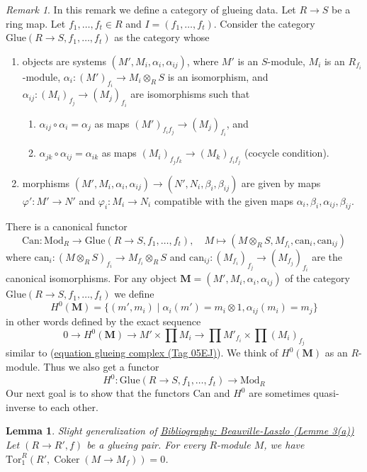 \documentclass{amsart}
\newenvironment{reference}{\comment}{\endcomment}
\theoremstyle{plain}
\newtheorem{lemma}[subsection]{Lemma}
\theoremstyle{definition}
\theoremstyle{remark}
\newtheorem{remark}[subsection]{Remark}
\numberwithin{equation}{subsection}
\def\Coker{\mathop{\mathrm{Coker}}}
\begin{document}
\begin{remark}
\label{remark-glueing-data}
In this remark we define a category of glueing data.
Let $R \to S$ be a ring map.
Let $f_1, \ldots, f_t \in R$ and $I = (f_1, \ldots, f_t)$.
Consider the category $\text{Glue}(R \to S, f_1, \ldots, f_t)$
as the category whose
\begin{enumerate}
\item objects are systems $(M', M_i, \alpha_i, \alpha_{ij})$, where
$M'$ is an $S$-module, $M_i$ is an $R_{f_i}$-module,
$\alpha_i : (M')_{f_i} \to M_i \otimes_R S$ is an isomorphism, and
$\alpha_{ij} : (M_i)_{f_j} \to (M_j)_{f_i}$ are isomorphisms
such that
\begin{enumerate}
\item $\alpha_{ij} \circ \alpha_i = \alpha_j$ as maps
$(M')_{f_if_j} \to (M_j)_{f_i}$, and
\item $\alpha_{jk} \circ \alpha_{ij} = \alpha_{ik}$ as maps
$(M_i)_{f_jf_k} \to (M_k)_{f_if_j}$ (cocycle condition).
\end{enumerate}
\item morphisms
$(M', M_i, \alpha_i, \alpha_{ij}) \to (N', N_i, \beta_i, \beta_{ij})$
are given by maps $\varphi' : M' \to N'$ and $\varphi_i : M_i \to N_i$
compatible with the given maps $\alpha_i, \beta_i, \alpha_{ij}, \beta_{ij}$.
\end{enumerate}
There is a canonical functor
$$
\text{Can} : \text{Mod}_R
\longrightarrow
\text{Glue}(R \to S, f_1, \ldots, f_t),
\quad
M \longmapsto (M \otimes_R S, M_{f_i}, \text{can}_i, \text{can}_{ij})
$$
where $\text{can}_i : (M \otimes_R S)_{f_i} \to M_{f_i} \otimes_R S$
and $\text{can}_{ij} : (M_{f_i})_{f_j} \to (M_{f_j})_{f_i}$
are the canonical isomorphisms. For any object
$\mathbf{M} = (M', M_i, \alpha_i, \alpha_{ij})$ of the category
$\text{Glue}(R \to S, f_1, \ldots, f_t)$ we define
$$
H^0(\mathbf{M}) =
\{(m', m_i) \mid \alpha_i(m') = m_i \otimes 1, \alpha_{ij}(m_i) = m_j\}
$$
in other words defined by the exact sequence
$$
0 \to H^0(\mathbf{M}) \to
M' \times \prod M_i \to
\prod M'_{f_i}
\times
\prod (M_i)_{f_j}
$$
similar to (\href{https://stacks.math.columbia.edu/tag/05EJ}{equation glueing complex (Tag 05EJ)}).
We think of $H^0(\mathbf{M})$ as an $R$-module. Thus we also get a functor
$$
H^0 :
\text{Glue}(R \to S, f_1, \ldots, f_t)
\longrightarrow
\text{Mod}_R
$$
Our next goal is to show that the functors
$\text{Can}$ and $H^0$ are sometimes quasi-inverse to each other.
\end{remark}


\begin{lemma}
\label{lemma-BL3}
\begin{reference}
Slight generalization of \href{https://stacks.math.columbia.edu/bibliography}{Bibliography: Beauville-Laszlo (Lemme 3(a))}
\end{reference}
Let $(R \to R', f)$ be a glueing pair. For every $R$-module $M$, we have
$\text{Tor}^R_1(R', \Coker(M \to M_f)) = 0$.
\end{lemma}
\end{document}
